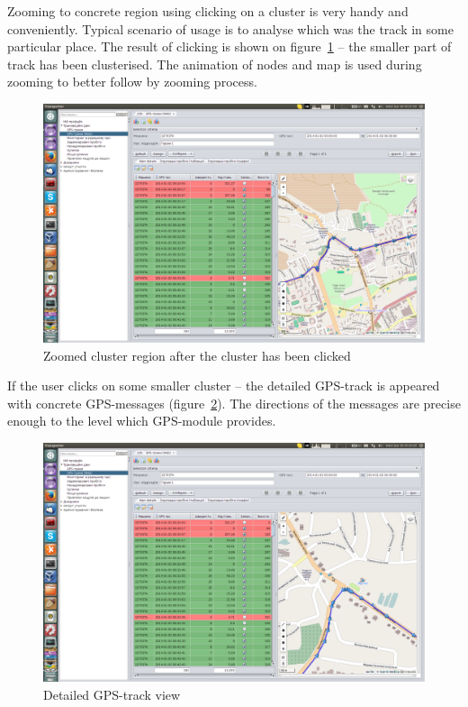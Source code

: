 \newpage
Zooming to concrete region using clicking on a cluster is very handy and conveniently. Typical scenario of usage is to analyse which was the track in some particular place. The result of clicking is shown on figure~\ref{fig:12} -- the smaller part of track has been clusterised. The animation of nodes and map is used during zooming to better follow by zooming process.

\begin{figure}[H]
\centering
\includegraphics[width=\linewidth]{chapters/02-gpstracks/images/12-zooming-by-clicking-a-cluster.png}
\caption{Zoomed cluster region after the cluster has been clicked}\label{fig:12}
\end{figure}

\newpage
If the user clicks on some smaller cluster -- the detailed GPS-track is appeared with concrete GPS-messages (figure~\ref{fig:13}). The directions of the messages are precise enough to the level which GPS-module provides. 

\begin{figure}[H]
\centering
\includegraphics[width=\linewidth]{chapters/02-gpstracks/images/13-detailed-gps-track-view.png}
\caption{Detailed GPS-track view}\label{fig:13}
\end{figure}

